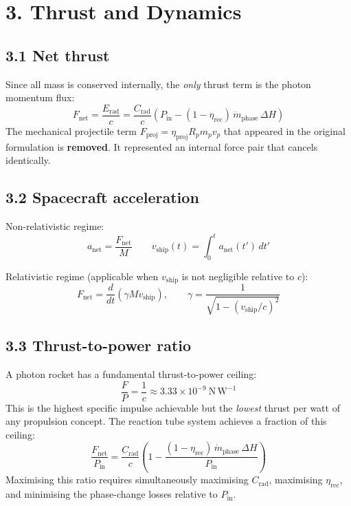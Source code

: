 \documentclass[12pt]{article}
\begin{document}
\section*{3. Thrust and Dynamics}

\subsection*{3.1 Net thrust}

Since all mass is conserved internally, the \emph{only} thrust term is the photon
momentum flux:
\[
  \boxed{F_{\mathrm{net}} = \frac{E_{\mathrm{rad}}}{c}
  = \frac{C_{\mathrm{rad}}}{c}\!\left(
    P_{\mathrm{in}} - (1-\eta_{\mathrm{rec}})\,\dot{m}_{\mathrm{phase}}\,\Delta H
  \right)}
\]
The mechanical projectile term $F_{\mathrm{proj}} = \eta_{\mathrm{proj}} R_p m_p v_p$
that appeared in the original formulation is \textbf{removed}. It represented an
internal force pair that cancels identically.

\subsection*{3.2 Spacecraft acceleration}

Non-relativistic regime:
\[
  a_{\mathrm{net}} = \frac{F_{\mathrm{net}}}{M}
  \qquad
  v_{\mathrm{ship}}(t) = \int_0^t a_{\mathrm{net}}(t')\,dt'
\]

Relativistic regime (applicable when $v_{\mathrm{ship}}$ is not negligible relative
to $c$):
\[
  F_{\mathrm{net}} = \frac{d}{dt}\!\left(\gamma M v_{\mathrm{ship}}\right),
  \qquad
  \gamma = \frac{1}{\sqrt{1-(v_{\mathrm{ship}}/c)^2}}
\]

\subsection*{3.3 Thrust-to-power ratio}

A photon rocket has a fundamental thrust-to-power ceiling:
\[
  \frac{F}{P} = \frac{1}{c} \approx 3.33 \times 10^{-9}\ \mathrm{N\,W^{-1}}
\]
This is the highest specific impulse achievable but the \emph{lowest} thrust per
watt of any propulsion concept. The reaction tube system achieves a fraction of
this ceiling:
\[
  \frac{F_{\mathrm{net}}}{P_{\mathrm{in}}} =
  \frac{C_{\mathrm{rad}}}{c}
  \left(1 - \frac{(1-\eta_{\mathrm{rec}})\,\dot{m}_{\mathrm{phase}}\,\Delta H}{P_{\mathrm{in}}}\right)
\]
Maximising this ratio requires simultaneously maximising $C_{\mathrm{rad}}$,
maximising $\eta_{\mathrm{rec}}$, and minimising the phase-change losses relative to
$P_{\mathrm{in}}$.
\end{document}

